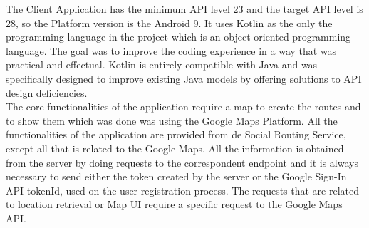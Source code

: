 The Client Application has the minimum API level 23 and the target API level is 28, so the Platform version is the Android 9.
It uses Kotlin as the only the programming language in the project which is an object oriented programming language. 
The goal was to improve the coding experience in a way that was practical and effectual. Kotlin is entirely compatible with Java and was specifically designed
to improve existing Java models by offering solutions to API design deficiencies. \\
The core functionalities of the application require a map to create the routes and to show them which was done was using the Google Maps Platform.
All the functionalities of the application are provided from de Social Routing Service, except all that is related to the Google Maps. All the information is obtained from the server by doing
requests to the correspondent endpoint and it is always necessary to send either the token created by the server or the Google Sign-In API tokenId, used on the user registration process.
The requests that are related to location retrieval or Map UI require a specific request to the Google Maps API. \\
\newpage

